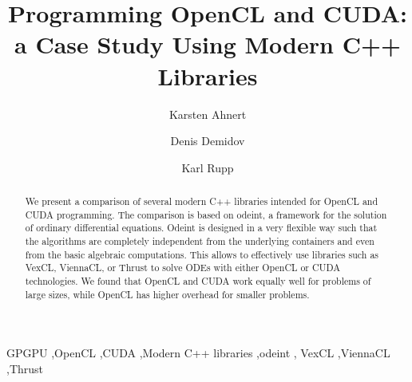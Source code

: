 \documentclass[1p]{elsarticle}
\begin{document}
\begin{frontmatter}

\title{Programming OpenCL and CUDA:\\a Case Study Using Modern C++ Libraries}

\author{Karsten Ahnert}
\address{
Institut f\"ur Physik und Astronomie, Universit\"at Potsdam,\\
Karl-Liebknecht-Strasse 24/25, 14476 Potsdam-Golm, Germany
}

\author{Denis Demidov}
\address{
Kazan Branch of Joint Supercomputer Center,
Russian Academy of Sciences,\\
Lobachevsky st. 2/31, 420008 Kazan, Russia
}

\author{Karl Rupp}
\address{Mathematics and Computer Science Division,
Argonne National Laboratory \\
9700 South Cass Avenue, Argonne, IL 60439, USA
}

\begin{abstract}
    We present a comparison of several modern C++ libraries intended for OpenCL
    and CUDA programming. The comparison is based on odeint, a framework for
    the solution of ordinary differential equations. Odeint is designed in a
    very flexible way such that the algorithms are completely independent from
    the underlying containers and even from the basic algebraic computations.
    This allows to effectively use libraries such as VexCL, ViennaCL, or Thrust
    to solve ODEs with either OpenCL or CUDA technologies. We found that OpenCL
    and CUDA work equally well for problems of large sizes, while OpenCL has
    higher overhead for smaller problems.

\end{abstract}

\begin{keyword}
    GPGPU \sep OpenCL \sep CUDA \sep Modern C++ libraries \sep odeint \sep
    VexCL \sep ViennaCL \sep Thrust
\end{keyword}

\end{frontmatter}
\end{document}
